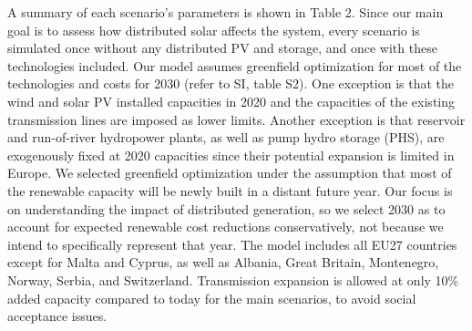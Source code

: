 \documentclass[review]{elsarticle}
\begin{document}
A summary of each scenario’s parameters is shown in Table 2. Since our main goal is to assess how distributed solar affects the system, every scenario is simulated once without any distributed PV and storage, and once with these technologies included. Our model assumes greenfield optimization for most of the technologies and costs for 2030 (refer to SI, table S2). One exception is that the wind and solar PV installed capacities in 2020 and the capacities of the existing transmission lines are imposed as lower limits. Another exception is that reservoir and run-of-river hydropower plants, as well as pump hydro storage (PHS), are exogenously fixed at 2020 capacities since their potential expansion is limited in Europe. We selected greenfield optimization under the assumption that most of the renewable capacity will be newly built in a distant future year. Our focus is on understanding the impact of distributed generation, so we select 2030 as to account for expected renewable cost reductions conservatively, not because we intend to specifically represent that year. The model includes all EU27 countries except for Malta and Cyprus, as well as Albania, Great Britain, Montenegro, Norway, Serbia, and Switzerland. Transmission expansion is allowed at only 10\% added capacity compared to today for the main scenarios, to avoid social acceptance issues.

\begin{table}[]
\caption{ Summary of scenario assumptions including distribution grid costs and distribution grid power losses. Discount rate is assumed to be 7\% for utility-scale solar PV and 4\% for distributed solar PV. Operation and maintenance is 1.95\% of investment cost for utility solar and 1.42\% for distributed solar. Lifetime is 40 years for both.}
\scriptsize
{}
\end{table}
\end{document}

